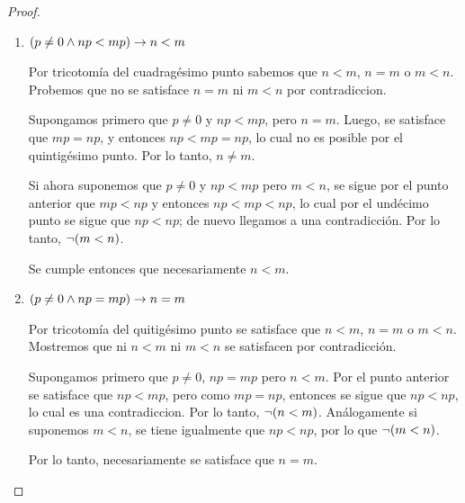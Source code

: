 \begin{proof}
\begin{enumerate}
		Mostremos por inducción sobre $p$. Para el caso base $p = 0$ se satisface directamente por vacuidad.

		Sea ahora $p$ tal que $p\neq 0$ y $n < m$ implica $np < mp$. Mostremos que se satisface para $p + 1$. Tenemos dos casos: $p = 0$ o $p\neq 0$. Si $p = 0$, entonces se satisface por el noveno y décimo punto que:
		\[
			n\pa*{p + 1} = n\cdot 1 = n < m = m\cdot 1 = m\pa*{p + 1}
		\]
		Si en cambio $p\neq 0$, entonces por hipótesis de inducción sabemos que $np < mp$. Luego se tiene lo siguiente por el axioma \ref{def_axiomas: producto_es_distributivo} y el undécimo punto:
		\[
			n\pa*{p + 1} = np + n < mp + n < mp + m = m\pa*{p +1}
		\]

		Se sigue por $\INDUCCION{\SIGMA{1}}$ que para cada $n, m, p$ se satisface que $n\neq 0$ y $n < m$ implica $np < mp$.

		\item $\pa*{p\neq 0\land np < mp}\to n < m$
		
		Por tricotomía del cuadragésimo punto sabemos que $n < m$, $n = m$ o $m < n$. Probemos que no se satisface $n = m$ ni $m < n$ por contradiccion.


		Supongamos primero que $p\neq 0$ y $np < mp$, pero $n = m$. Luego, se satisface que $mp = np$, y entonces $np < mp = np$, lo cual no es posible por el quintigésimo punto. Por lo tanto, $n\neq m$.

		Si ahora suponemos que $p\neq 0$ y $np < mp$ pero $m < n$, se sigue por el punto anterior que $mp < np$ y entonces $np < mp < np$, lo cual por el undécimo punto se sigue que $np < np$; de nuevo llegamos a una contradicción. Por lo tanto, $\neg\pa*{m < n}$.

		Se cumple entonces que necesariamente $n < m$.

		\item $\pa*{p\neq 0\land np = mp}\to n = m$
		
		Por tricotomía del quitigésimo punto se satisface que $n < m$, $n = m$ o $m < n$. Mostremos que ni $n < m$ ni $m < n$ se satisfacen por contradicción.

		Supongamos primero que $p\neq 0$, $np = mp$ pero $n < m$. Por el punto anterior se satisface que $np < mp$, pero como $mp = np$, entonces se sigue que $np < np$, lo cual es una contradiccion. Por lo tanto, $\neg\pa*{n < m}$. Análogamente si suponemos $m < n$, se tiene igualmente que $np < np$, por lo que $\neg\pa*{m < n}$.
		
		Por lo tanto, necesariamente se satisface que $n = m$.


\end{enumerate}
\end{proof}
